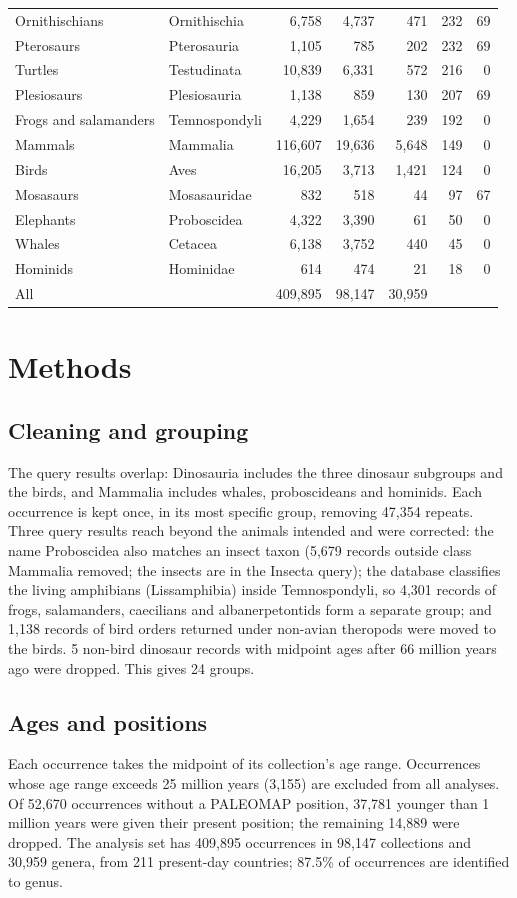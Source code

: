 \documentclass[11pt,a4paper]{article}
\begin{document}
\begin{table}[tbp]
\begin{tabular}{llrrrrr}
Ornithischians & Ornithischia & 6,758 & 4,737 & 471 & 232 & 69\\
Pterosaurs & Pterosauria & 1,105 & 785 & 202 & 232 & 69\\
Turtles & Testudinata & 10,839 & 6,331 & 572 & 216 & 0\\
Plesiosaurs & Plesiosauria & 1,138 & 859 & 130 & 207 & 69\\
Frogs and salamanders & Temnospondyli & 4,229 & 1,654 & 239 & 192 & 0\\
Mammals & Mammalia & 116,607 & 19,636 & 5,648 & 149 & 0\\
Birds & Aves & 16,205 & 3,713 & 1,421 & 124 & 0\\
Mosasaurs & Mosasauridae & 832 & 518 & 44 & 97 & 67\\
Elephants & Proboscidea & 4,322 & 3,390 & 61 & 50 & 0\\
Whales & Cetacea & 6,138 & 3,752 & 440 & 45 & 0\\
Hominids & Hominidae & 614 & 474 & 21 & 18 & 0\\
\midrule All & & 409,895 & 98,147 & 30,959 & & \\\bottomrule\end{tabular}\end{table}

\section{Methods}
\subsection{Cleaning and grouping}
The query results overlap: Dinosauria includes the three dinosaur subgroups and the birds, and Mammalia includes whales, proboscideans and hominids. Each occurrence is kept once, in its most specific group, removing 47,354 repeats. Three query results reach beyond the animals intended and were corrected: the name Proboscidea also matches an insect taxon (5,679 records outside class Mammalia removed; the insects are in the Insecta query); the database classifies the living amphibians (Lissamphibia) inside Temnospondyli, so 4,301 records of frogs, salamanders, caecilians and albanerpetontids form a separate group; and 1,138 records of bird orders returned under non-avian theropods were moved to the birds. 5 non-bird dinosaur records with midpoint ages after 66 million years ago were dropped. This gives 24 groups.

\subsection{Ages and positions}
Each occurrence takes the midpoint of its collection's age range. Occurrences whose age range exceeds 25 million years (3,155) are excluded from all analyses. Of 52,670 occurrences without a PALEOMAP position, 37,781 younger than 1 million years were given their present position; the remaining 14,889 were dropped. The analysis set has 409,895 occurrences in 98,147 collections and 30,959 genera, from 211 present-day countries; 87.5\% of occurrences are identified to genus.
\end{document}

